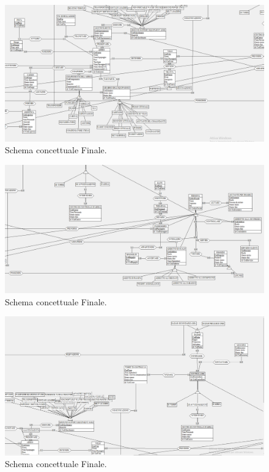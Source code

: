 \begin{figure}[H] 
	\centering
	\includegraphics[width=1.2\linewidth, height=1.2\textheight, keepaspectratio]{./img/Schema_Concettuale/Schema_Finale1.png} 
	\caption{Schema concettuale Finale.}
	\label{fig:schema_finale1}
\end{figure}

\begin{figure}[H] 
	\centering
	\includegraphics[width=1.2\linewidth, height=1.2\textheight, keepaspectratio]{./img/Schema_Concettuale/Schema_Finale2.png}
	\caption{Schema concettuale Finale.}
	\label{fig:schema_finale2}
\end{figure}

\begin{figure}[H] 
	\centering
	\includegraphics[width=1.2\linewidth, height=1.2\textheight, keepaspectratio]{./img/Schema_Concettuale/Schema_Finale3.png}
	\caption{Schema concettuale Finale.}
	\label{fig:schema_finale3}
\end{figure}

